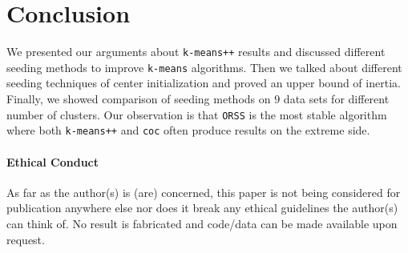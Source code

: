 \documentclass[12pt]{article}
\begin{document}
	\section{Conclusion}
	We presented our arguments about \texttt{k-means++} results and discussed different seeding methods to improve \texttt{k-means} algorithms. Then we talked about different seeding techniques of center initialization and proved an upper bound of inertia. Finally, we showed comparison of seeding methods on $9$ data sets for different number of clusters. Our observation is that \texttt{ORSS} is the most stable algorithm where both \texttt{k-means++} and \texttt{coc} often produce results on the extreme side.
	\paragraph{Ethical Conduct}
	As far as the author(s) is (are) concerned, this paper is not being considered for publication anywhere else nor does it break any ethical guidelines the author(s) can think of. No result is fabricated and code/data can be made available upon request.
	\printbibliography
\end{document}
